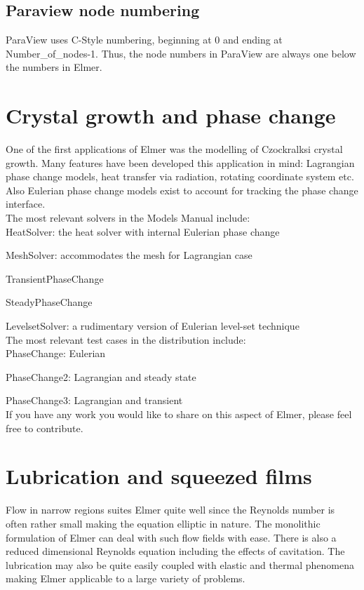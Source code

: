 \subsection{Paraview node numbering}

ParaView uses C-Style numbering, beginning at 0 and ending at Number\_of\_nodes-1. Thus, the node numbers in ParaView are always one below the numbers in Elmer. 

\section{Crystal growth and phase change}

One of the first applications of Elmer was the modelling of Czockralksi crystal growth. Many features have been developed this application in mind: Lagrangian phase change models, heat transfer via radiation, rotating coordinate system etc. Also Eulerian phase change models exist to account for tracking the phase change interface.\\

\noindent The most relevant solvers in the Models Manual include:\\

    HeatSolver: the heat solver with internal Eulerian phase change

    MeshSolver: accommodates the mesh for Lagrangian case

    TransientPhaseChange

    SteadyPhaseChange

    LevelsetSolver: a rudimentary version of Eulerian level-set technique\\

\noindent The most relevant test cases in the distribution include:\\

    PhaseChange: Eulerian

    PhaseChange2: Lagrangian and steady state

    PhaseChange3: Lagrangian and transient\\

\noindent If you have any work you would like to share on this aspect of Elmer, please feel free to contribute. 

\section{Lubrication and squeezed films}

Flow in narrow regions suites Elmer quite well since the Reynolds number is often rather small making the equation elliptic in nature. The monolithic formulation of Elmer can deal with such flow fields with ease. There is also a reduced dimensional Reynolds equation including the effects of cavitation. The lubrication may also be quite easily coupled with elastic and thermal phenomena making Elmer applicable to a large variety of problems.\\

